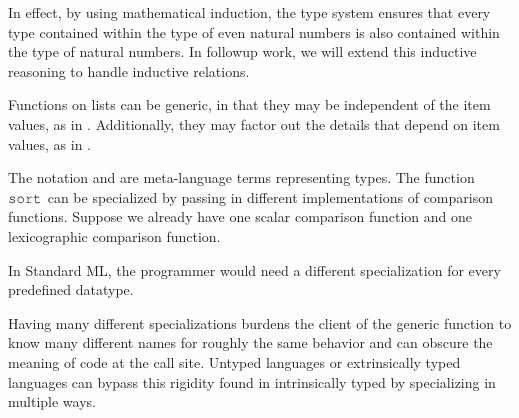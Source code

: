 \documentclass[acmsmall]{acmart}
\theoremstyle{definition}
\begin{document}

\noindent
In effect, by using mathematical induction, the type system ensures that 
every type contained within the type of even natural numbers is also
contained within the type of natural numbers.
In followup work, we will extend this inductive reasoning to handle inductive relations. 

Functions on lists can be generic, in that they may be independent of the item values, as in .
Additionally, they may factor out the details that depend on item values, as in . 


\noindent
The notation  and  are meta-language terms representing types.
The function $\J{sort}$ can be specialized by passing in different implementations of comparison functions.
Suppose we already have one scalar comparison function and one lexicographic comparison function.


\noindent
In Standard ML, the programmer would need a different specialization for every predefined
datatype. 


\noindent
Having many different specializations burdens the client of
the generic function to know many different names for roughly the same behavior and can obscure the meaning
of code at the call site. 
Untyped languages or extrinsically typed languages can bypass this rigidity found in intrinsically typed by specializing in multiple ways.
\end{document}
